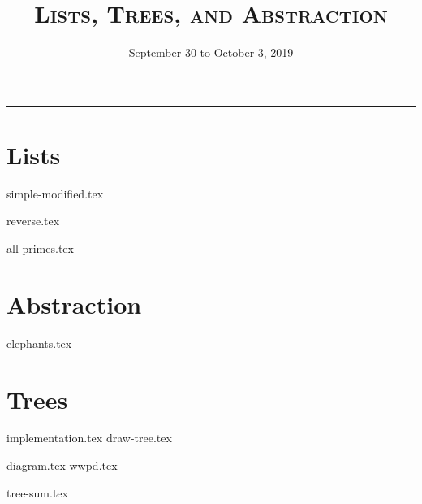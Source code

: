 \documentclass{exam}
\title{\textsc{Lists, Trees, and Abstraction}}
\date{September 30 to October 3, 2019}
\begin{document}
\maketitle
\rule{\textwidth}{0.15em}
\fontsize{12}{15}\selectfont


\section{Lists}
\begin{questions}
{simple-modified.tex}

\begin{blocksection}
{reverse.tex}
\end{blocksection}

\begin{blocksection}
{all-primes.tex}
\end{blocksection}

\section{Abstraction}
{elephants.tex}

\end{questions}

\newpage
\section{Trees}
{implementation.tex}
{draw-tree.tex}
\newpage
\begin{questions}
{diagram.tex}
{wwpd.tex}

{tree-sum.tex}

\end{questions}
\end{document}
